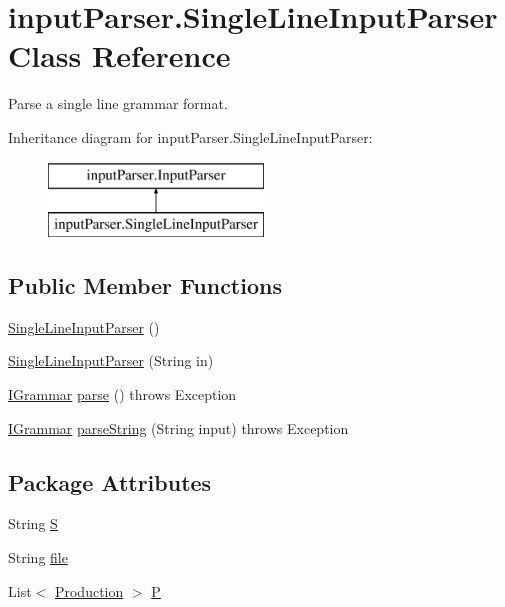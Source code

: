 \hypertarget{classinput_parser_1_1_single_line_input_parser}{\section{input\-Parser.\-Single\-Line\-Input\-Parser Class Reference}
\label{classinput_parser_1_1_single_line_input_parser}
}


Parse a single line grammar format.  


Inheritance diagram for input\-Parser.\-Single\-Line\-Input\-Parser\-:\begin{figure}[H]
\begin{center}
\leavevmode
\includegraphics[height=2.000000cm]{classinput_parser_1_1_single_line_input_parser}
\end{center}
\end{figure}
\subsection*{Public Member Functions}
\begin{DoxyCompactItemize}
\item 
\hyperlink{classinput_parser_1_1_single_line_input_parser_a27debde7d5d677d8b31d69d18622f94b}{Single\-Line\-Input\-Parser} ()
\item 
\hyperlink{classinput_parser_1_1_single_line_input_parser_a3efb0396347ec7ed7376dbd37eb4d28c}{Single\-Line\-Input\-Parser} (String in)
\item 
\hyperlink{interfacecontext_free_1_1grammar_1_1_i_grammar}{I\-Grammar} \hyperlink{classinput_parser_1_1_single_line_input_parser_ad822676b0d3182a591e2004c3bcc79d5}{parse} ()  throws Exception 
\item 
\hyperlink{interfacecontext_free_1_1grammar_1_1_i_grammar}{I\-Grammar} \hyperlink{classinput_parser_1_1_single_line_input_parser_a90641140f8686fc97fd40b72beccf0a3}{parse\-String} (String input)  throws Exception 
\end{DoxyCompactItemize}
\subsection*{Package Attributes}
\begin{DoxyCompactItemize}
\item 
String \hyperlink{classinput_parser_1_1_single_line_input_parser_afaca00d01ba13c5fc39fe11309aba895}{S}
\item 
String \hyperlink{classinput_parser_1_1_single_line_input_parser_a46401abfc8915fde62cc6109f520028a}{file}
\item 
List$<$ \hyperlink{classcontext_free_1_1grammar_1_1_production}{Production} $>$ \hyperlink{classinput_parser_1_1_single_line_input_parser_a07d3d934d89d64a72eb0a06b89e684a8}{P}
\end{DoxyCompactItemize}


